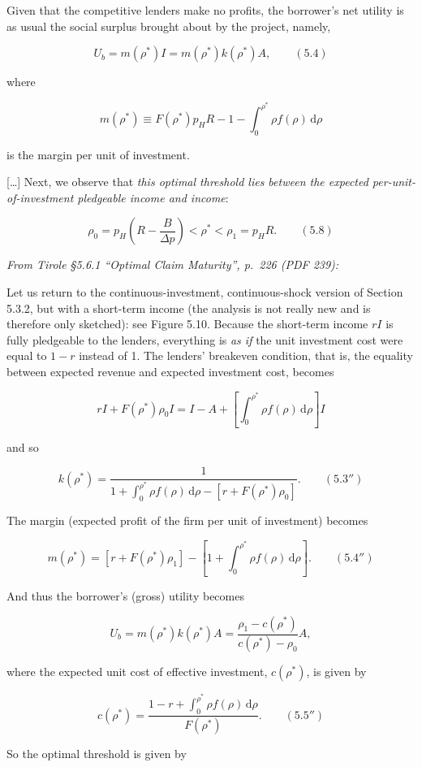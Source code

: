 \documentclass[11pt,a4paper]{article}
\begin{document}
Given that the competitive lenders make no profits, the borrower's net utility is as usual the
social surplus brought about by the project, namely,

\[U_b = m(\rho^*)I = m(\rho^*)k(\rho^*)A, \qquad (5.4)\]

where

\[m(\rho^*) \equiv F(\rho^*)p_HR - 1 - \int_0^{\rho^*}\rho f(\rho)\,\mathrm{d}\rho\]

is the margin per unit of investment.

{[}\ldots{]} Next, we observe that \emph{this optimal threshold lies between the expected
per-unit-of-investment pledgeable income and income}:

\[\rho_0 = p_H\left(R - \frac{B}{\Delta p}\right) < \rho^* < \rho_1 = p_HR. \qquad (5.8)\]

\emph{From Tirole §5.6.1 ``Optimal Claim Maturity'', p.~226 (PDF 239):}

Let us return to the continuous-investment, continuous-shock version of Section 5.3.2, but with a
short-term income (the analysis is not really new and is therefore only sketched): see Figure 5.10.
Because the short-term income \(rI\) is fully pledgeable to the lenders, everything is \emph{as if}
the unit investment cost were equal to \(1 - r\) instead of 1. The lenders' breakeven condition,
that is, the equality between expected revenue and expected investment cost, becomes

\[rI + F(\rho^*)\rho_0I = I - A + \left[\int_0^{\rho^*}\rho f(\rho)\,\mathrm{d}\rho\right]I\]

and so

\[k(\rho^*) = \frac{1}{1 + \int_0^{\rho^*}\rho f(\rho)\,\mathrm{d}\rho - [r + F(\rho^*)\rho_0]}. \qquad (5.3'')\]

The margin (expected profit of the firm per unit of investment) becomes

\[m(\rho^*) = [r + F(\rho^*)\rho_1] - \left[1 + \int_0^{\rho^*}\rho f(\rho)\,\mathrm{d}\rho\right]. \qquad (5.4'')\]

And thus the borrower's (gross) utility becomes

\[U_b = m(\rho^*)k(\rho^*)A = \frac{\rho_1 - c(\rho^*)}{c(\rho^*) - \rho_0}A,\]

where the expected unit cost of effective investment, \(c(\rho^*)\), is given by

\[c(\rho^*) = \frac{1 - r + \int_0^{\rho^*}\rho f(\rho)\,\mathrm{d}\rho}{F(\rho^*)}. \qquad (5.5'')\]

So the optimal threshold is given by
\end{document}
